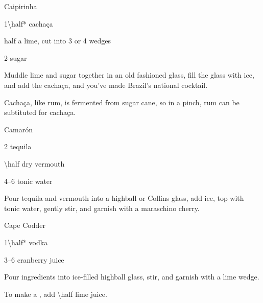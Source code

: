 \begin{Cocktail}{Caipirinha}
	\begin{Ingredients}
	\item \SI{1\half*}{\oz} cacha\c{c}a
	\item half a lime, cut into 3 or 4 wedges
	\item \SI{2}{\tsp} sugar
	\end{Ingredients}
	
	\begin{Instructions}
	Muddle lime and sugar together in an old fashioned glass, fill the glass with ice, and add the cacha\c{c}a, and you've made Brazil's national cocktail.
	
	Cacha\c{c}a, like rum, is fermented from sugar cane, so in a pinch, rum can be subtituted for cacha\c{c}a.
	\end{Instructions}
\end{Cocktail}

\begin{Cocktail*}{Camar\'{o}n}
	\begin{Ingredients}
	\item \SI{2}{\oz} tequila
	\item \SI{\half}{\oz} dry vermouth
	\item \SIrange{4}{6}{\oz} tonic water
	\end{Ingredients}
	
	\begin{Instructions}
	Pour tequila and vermouth into a highball or Collins glass, add ice, top with tonic water, gently stir, and garnish with a maraschino cherry.
	\end{Instructions}
\end{Cocktail*}

\begin{Cocktail}{Cape Codder}
	\begin{Ingredients}
	\item \SI{1\half*}{\oz} vodka
	\item \SIrange{3}{6}{\oz} cranberry juice
	\end{Ingredients}
	
	\begin{Instructions}
	Pour ingredients into ice-filled highball glass, stir, and garnish with a lime wedge.
	
	To make a , add \SI{\half}{\oz} lime juice.
	\end{Instructions}
\end{Cocktail}

